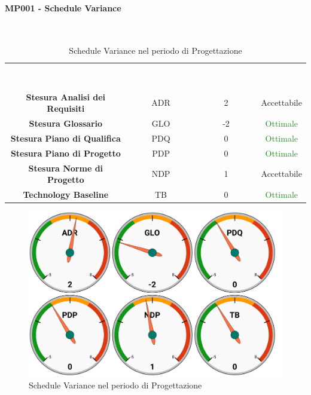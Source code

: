 \paragraph{MP001 - Schedule Variance}\mbox{}\\[0,3cm]
\begin{table}[H]
    \centering
    \begin{tabular}{cccc}
        \rowcolor{greySWEight}
        \textcolor{white}{\textbf{Attività}} & 
        \textcolor{white}{\textbf{Abbreviazione}} &
        \textcolor{white}{\textbf{Valore Indice}}&
        \textcolor{white}{\textbf{Riscontro}}\\
		\textbf{Stesura Analisi dei Requisiti} & ADR & 2 & \textcolor{YellowOrange}{Accettabile}\\
		\textbf{Stesura Glossario} & GLO & -2 & \textcolor{ForestGreen}{Ottimale} \\
		\textbf{Stesura Piano di Qualifica} & PDQ & 0 & \textcolor{ForestGreen}{Ottimale} \\
		\textbf{Stesura Piano di Progetto} & PDP & 0 & \textcolor{ForestGreen}{Ottimale} \\
		\textbf{Stesura Norme di Progetto} & NDP & 1 & \textcolor{YellowOrange}{Accettabile} \\
		\textbf{Technology Baseline} & TB & 0 & \textcolor{ForestGreen}{Ottimale} \\

    \end{tabular}
    \caption{Schedule Variance nel periodo di Progettazione}
\end{table}
\begin{figure}[H]
    \centering
	\includegraphics[width=1\linewidth]{sez/App_Esito/Progettazione/graph/PR_SV.pdf}
	\caption{Schedule Variance nel periodo di Progettazione}
\end{figure}

